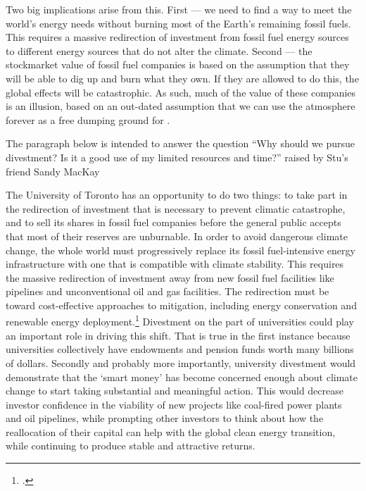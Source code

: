 Two big implications arise from this. 
First --- we need to find a way to meet the world's energy needs without burning most of the Earth's remaining fossil fuels. 
This requires a massive redirection of investment from fossil fuel energy sources to different energy sources that do not alter the climate.
Second --- the stockmarket value of fossil fuel companies is based on the assumption that they will be able to dig up and burn what they own.
If they are allowed to do this, the global effects will be catastrophic.
As such, much of the value of these companies is an illusion, based on an out-dated assumption that we can use the atmosphere forever as a free dumping ground for .

\begin{vcom}
The paragraph below is intended to answer the question ``Why should we pursue divestment? Is it a good use of my limited resources and time?'' raised by Stu's friend Sandy MacKay
\end{vcom}


The University of Toronto has an opportunity to do two things: to take part in the redirection of investment that is necessary to prevent climatic catastrophe, and to sell its shares in fossil fuel companies before the general public accepts that most of their reserves are unburnable.
In order to avoid dangerous climate change, the whole world must progressively replace its fossil fuel-intensive energy infrastructure with one that is compatible with climate stability.
This requires the massive redirection of investment away from new fossil fuel facilities like pipelines and unconventional oil and gas facilities.
The redirection must be toward cost-effective approaches to  mitigation, including energy conservation and renewable energy deployment.\footcite[The consultancy McKinsey \& Company has studied and ranked global mitigation options, in terms of their cost, plausible deployment speed, and their capacity to mitigate greenhouse gas pollution. See: ][p. 8]{McKinseyCurve}
Divestment on the part of universities could play an important role in driving this shift.
That is true in the first instance because universities collectively have endowments and pension funds worth many billions of dollars.
Secondly and probably more importantly, university divestment would demonstrate that the `smart money' has become concerned enough about climate change to start taking substantial and meaningful action.
This would decrease investor confidence in the viability of new projects like coal-fired power plants and oil pipelines, while prompting other investors to think about how the reallocation of their capital can help with the global clean energy transition, while continuing to produce stable and attractive returns.




